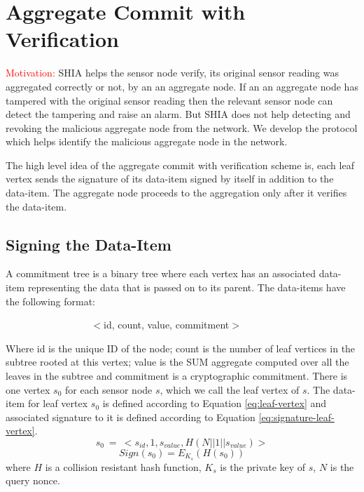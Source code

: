 \chapter{Aggregate Commit with Verification} %
\label{cha:A Protocol for Commitment Tree Generation}
	
	\textcolor{red}{Motivation:}
	SHIA helps the sensor node verify, its original sensor reading was aggregated correctly or not, by an an aggregate node.
	If an an aggregate node has tampered with the original sensor reading then the relevant sensor node can detect the tampering and raise an alarm.
	But SHIA does not help detecting and revoking the malicious aggregate node from the network.
	We develop the protocol which helps identify the malicious aggregate node in the network.
	
	The high level idea of the aggregate commit with verification scheme is, each leaf vertex sends the signature of its data-item signed by itself in addition to the data-item.
	The aggregate node proceeds to the aggregation only after it verifies the data-item.

\section{Signing the Data-Item}
	\begin{definition}
		\label{def:data-item}
		A commitment tree is a binary tree where each vertex has an associated data-item representing the data that is passed on to its parent. The data-items have the following format:

		$\hspace{100pt}$ $<$id, count, value, commitment$>$
	\end{definition}
	Where id is the unique ID of the node; count is the number of leaf vertices in the subtree rooted at this vertex; value is the SUM aggregate computed over all the leaves in the subtree and commitment is a cryptographic commitment.
	There is one vertex $s_{0}$ for each sensor node $s$, which we call the leaf vertex of $s$.
	The data-item for leaf vertex $s_{0}$ is defined according to Equation \ref{eq:leaf-vertex} and associated signature to it is defined according to Equation \ref{eq:signature-leaf-vertex}.
	\begin{equation}
		\label{eq:leaf-vertex}
		s_{0}\ =\ <s_{id}, 1, s_{value}, H(N||1||s_{value})>
	\end{equation}
	\begin{equation}
		\label{eq:signature-leaf-vertex}
		Sign(s_{0}) = E_{K_{s}}(H(s_{0}))
	\end{equation}
	where $H$ is a collision resistant hash function, $K_{s}$ is the private key of $s$, $N$ is the query nonce.

